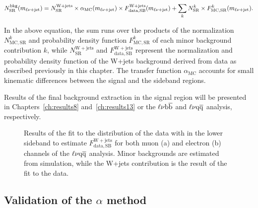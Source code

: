 \begin{equation}\label{eqn:alpha_totalBkg}
\small
N_\mathrm{SR}^\mathrm{bkg}(m_{\ell\nu+{\rm jet}}) = N_\mathrm{SR}^\mathrm{W+jets} \times \alpha_\mathrm{MC}(m_{\ell\nu+{\rm jet}}) \times F_\mathrm{data, SB}^{\mathrm{W+jets}}(m_{\ell\nu+{\rm jet}}) + \sum_{k} N_\mathrm{SR}^k \times F_\mathrm{MC,SR}^k(m_{\ell\nu+{\rm jet}}).
\end{equation}

In the above equation, the sum runs over the products of the normalization $N_\mathrm{MC,SR}^k$ and probability density function $F_\mathrm{MC,SR}^k$ of each minor background contribution $k$, while $N_\mathrm{SR}^\mathrm{W+jets}$ and $F_\mathrm{data, SB}^{\mathrm{W+jets}}$ represent the normalization and probability density function of the W+jets background derived from data as described previously in this chapter. The transfer function $\alpha_\mathrm{MC}$ accounts for small kinematic differences between the signal and the sideband regions.

Results of the final background extraction in the signal region will be presented in Chapters~\ref{ch:results8} and~\ref{ch:results13} or the $\ell\nu{\mathrm{b}\overline{\mathrm{b}}}$ and $\ell\nu\mathrm{q}\overline{\mathrm{q}}$ analysis, respectively.

\begin{figure}[!htb]
\centering
{}
\caption{Results of the fit to the \mWV distribution of the data with \mJ in the lower sideband to estimate $F_\mathrm{data, SB}^{\mathrm{W+jets}}$ for both muon (a) and electron (b) channels of the $\ell\nu\mathrm{q}\overline{\mathrm{q}}$ analysis. Minor backgrounds are estimated from simulation, while the W+jets contribution is the result of the fit to the data.}
\label{fig:sbfitmlvj13TeV}
\end{figure}

\subsection{Validation of the $\alpha$ method}

